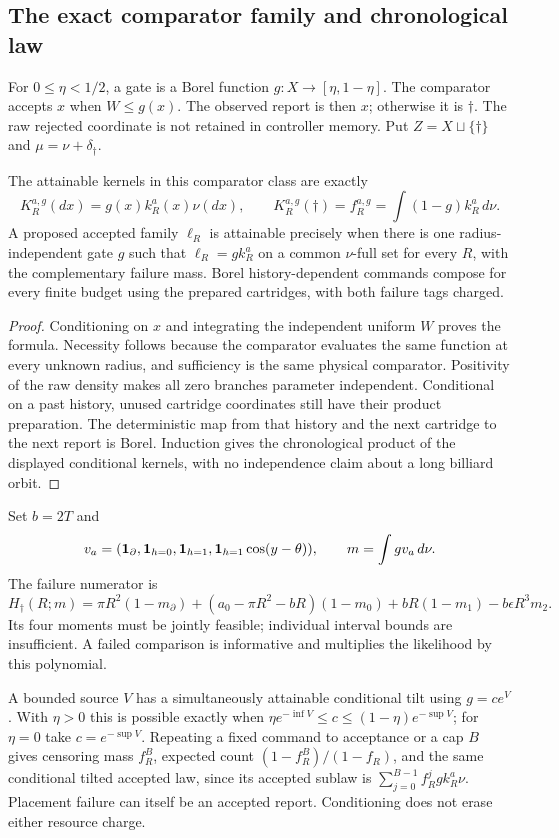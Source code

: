 \subsection{The exact comparator family and chronological law}
For $0\le\eta<1/2$, a gate is a Borel function $g:X\to[\eta,1-\eta]$. The comparator accepts $x$ when $W\le g(x)$. The observed report is then $x$; otherwise it is $\dagger$. The raw rejected coordinate is not retained in controller memory. Put $Z=X\sqcup\{\dagger\}$ and $\mu=\nu+\delta_\dagger$.
\begin{proposition}\label{prop:realize}
The attainable kernels in this comparator class are exactly
\begin{equation}
 K_R^{a,g}(dx)=g(x)k_R^a(x)\nu(dx),\qquad
 K_R^{a,g}(\dagger)=f_R^{a,g}=\int(1-g)k_R^a\,d\nu.
 \label{eq:gated}
\end{equation}
A proposed accepted family $\ell_R$ is attainable precisely when there is one radius-independent gate $g$ such that $\ell_R=gk_R^a$ on a common $\nu$-full set for every $R$, with the complementary failure mass. Borel history-dependent commands compose for every finite budget using the prepared cartridges, with both failure tags charged.
\end{proposition}
\begin{proof}
Conditioning on $x$ and integrating the independent uniform $W$ proves the formula. Necessity follows because the comparator evaluates the same function at every unknown radius, and sufficiency is the same physical comparator. Positivity of the raw density makes all zero branches parameter independent. Conditional on a past history, unused cartridge coordinates still have their product preparation. The deterministic map from that history and the next cartridge to the next report is Borel. Induction gives the chronological product of the displayed conditional kernels, with no independence claim about a long billiard orbit.
\end{proof}

Set $b=2T$ and
\[
 v_a=(\mathbf1_\partial,\mathbf1_{h=0},\mathbf1_{h=1},\mathbf1_{h=1}\cos(y-\theta)),
 \qquad m=\int gv_a\,d\nu.
\]
The failure numerator is
\begin{equation}
 H_\dagger(R;m)=\pi R^2(1-m_\partial)
 +(a_0-\pi R^2-bR)(1-m_0)+bR(1-m_1)-b\epsilon R^3m_2.
 \label{eq:failure}
\end{equation}
Its four moments must be jointly feasible; individual interval bounds are insufficient. A failed comparison is informative and multiplies the likelihood by this polynomial.

A bounded source $V$ has a simultaneously attainable conditional tilt using $g=ce^V$. With $\eta>0$ this is possible exactly when
$\eta e^{-\inf V}\le c\le(1-\eta)e^{-\sup V}$; for $\eta=0$ take $c=e^{-\sup V}$. Repeating a fixed command to acceptance or a cap $B$ gives censoring mass $f_R^B$, expected count $(1-f_R^B)/(1-f_R)$, and the same conditional tilted accepted law, since its accepted sublaw is $\sum_{j=0}^{B-1}f_R^j gk_R^a\nu$. Placement failure can itself be an accepted report. Conditioning does not erase either resource charge.
